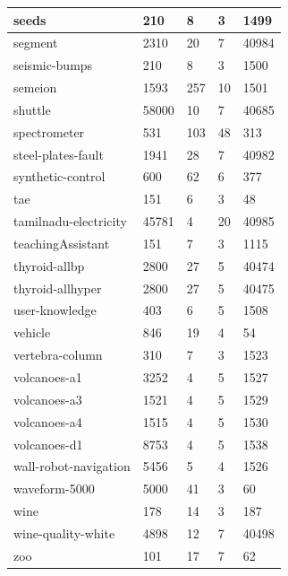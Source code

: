 \documentclass[times,specification,annotation]{itmo-student-thesis}
\begin{document}
\begin{center}
\begin{longtable}{ |m{5cm}|m{2.5cm}|m{2.5cm}|m{2cm}|m{2cm}| }
			\hline
			seeds & 210 & 8 & 3 & 1499 \\
			\hline
			segment & 2310 & 20 & 7 & 40984 \\
			\hline
			seismic-bumps & 210 & 8 & 3 & 1500 \\
			\hline
			semeion & 1593 & 257 & 10 & 1501 \\
			\hline
			shuttle & 58000 & 10 & 7 & 40685 \\
			\hline
			spectrometer & 531 & 103 & 48 & 313 \\
			\hline
			steel-plates-fault & 1941 & 28 & 7 & 40982 \\
			\hline
			synthetic-control & 600 & 62 & 6 & 377 \\
			\hline
			tae & 151 & 6 & 3 & 48 \\
			\hline
			tamilnadu-electricity & 45781 & 4 & 20 & 40985 \\
			\hline
			teachingAssistant & 151 & 7 & 3 & 1115 \\
			\hline
			thyroid-allbp & 2800 & 27 & 5 & 40474 \\
			\hline
			thyroid-allhyper & 2800 & 27 & 5 & 40475 \\
			\hline
			user-knowledge & 403 & 6 & 5 & 1508 \\
			\hline
			vehicle & 846 & 19 & 4 & 54 \\
			\hline
			vertebra-column & 310 & 7 & 3 & 1523 \\
			\hline
			volcanoes-a1 & 3252 & 4 & 5 & 1527 \\
			\hline
			volcanoes-a3 & 1521 & 4 & 5 & 1529 \\
			\hline
			volcanoes-a4 & 1515 & 4 & 5 & 1530 \\
			\hline
			volcanoes-d1 & 8753 & 4 & 5 & 1538 \\
			\hline
			wall-robot-navigation & 5456 & 5 & 4 & 1526 \\
			\hline
			waveform-5000 & 5000 & 41 & 3 & 60 \\
			\hline
			wine & 178 & 14 & 3 & 187 \\
			\hline
			wine-quality-white & 4898 & 12 & 7 & 40498 \\
			\hline
			zoo & 101 & 17 & 7 & 62 \\
			\hline
		\end{longtable}
	\end{center}
\end{document}
